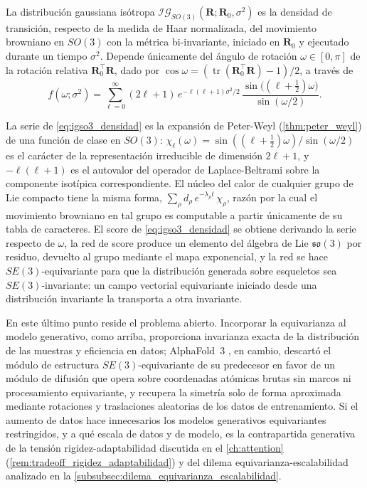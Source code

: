 \begin{definition}\label{def:igso3}
La distribución gaussiana isótropa $\mathcal{IG}_{SO(3)}(\mathbf{R}; \mathbf{R}_0, \sigma^2)$ es la densidad de transición, respecto de la medida de Haar normalizada, del movimiento browniano en $SO(3)$ con la métrica bi-invariante, iniciado en $\mathbf{R}_0$ y ejecutado durante un tiempo $\sigma^2$. Depende únicamente del ángulo de rotación $\omega \in [0, \pi]$ de la rotación relativa $\mathbf{R}_0^\top \mathbf{R}$, dado por $\cos\omega = (\operatorname{tr}(\mathbf{R}_0^\top \mathbf{R}) - 1)/2$, a través de
\begin{equation}\label{eq:igso3_densidad}
    f(\omega; \sigma^2) = \sum_{\ell = 0}^{\infty} (2\ell + 1)\, e^{-\ell(\ell+1)\sigma^2/2}\, \frac{\sin\big((\ell + \tfrac{1}{2})\omega\big)}{\sin(\omega/2)}.
\end{equation}
\end{definition}

La serie de \eqref{eq:igso3_densidad} es la expansión de Peter-Weyl (\autoref{thm:peter_weyl}) de una función de clase en $SO(3)$: $\chi_\ell(\omega) = \sin((\ell + \tfrac{1}{2})\omega)/\sin(\omega/2)$ es el carácter de la representación irreducible de dimensión $2\ell + 1$, y $-\ell(\ell+1)$ es el autovalor del operador de Laplace-Beltrami sobre la componente isotípica correspondiente. El núcleo del calor de cualquier grupo de Lie compacto tiene la misma forma, $\sum_\rho d_\rho\, e^{-\lambda_\rho t}\, \chi_\rho$, razón por la cual el movimiento browniano en tal grupo es computable a partir únicamente de su tabla de caracteres. El score de \eqref{eq:igso3_densidad} se obtiene derivando la serie respecto de $\omega$, la red de score produce un elemento del álgebra de Lie $\mathfrak{so}(3)$ por residuo, devuelto al grupo mediante el mapa exponencial, y la red se hace $SE(3)$-equivariante para que la distribución generada sobre esqueletos sea $SE(3)$-invariante: un campo vectorial equivariante iniciado desde una distribución invariante la transporta a otra invariante.

En este último punto reside el problema abierto. Incorporar la equivarianza al modelo generativo, como arriba, proporciona invarianza exacta de la distribución de las muestras y eficiencia en datos; AlphaFold~3 \citep{abramson2024alphafold3}, en cambio, descartó el módulo de estructura $SE(3)$-equivariante de su predecesor en favor de un módulo de difusión que opera sobre coordenadas atómicas brutas sin marcos ni procesamiento equivariante, y recupera la simetría solo de forma aproximada mediante rotaciones y traslaciones aleatorias de los datos de entrenamiento. Si el aumento de datos hace innecesarios los modelos generativos equivariantes restringidos, y a qué escala de datos y de modelo, es la contrapartida generativa de la tensión rigidez-adaptabilidad discutida en el \autoref{ch:attention} (\autoref{rem:tradeoff_rigidez_adaptabilidad}) y del dilema equivarianza-escalabilidad analizado en la \autoref{subsubsec:dilema_equivarianza_escalabilidad}.

